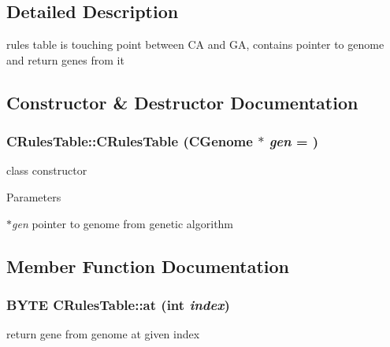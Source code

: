 \subsection{Detailed Description}
rules table is touching point between CA and GA, contains pointer to genome and return genes from it 

\subsection{Constructor \& Destructor Documentation}
\hypertarget{classCRulesTable_a17239390129d5e8f517046633c9f1d87}{
\subsubsection[{CRulesTable}]{\setlength{\rightskip}{0pt plus 5cm}CRulesTable::CRulesTable ({\bf CGenome} $\ast$ {\em gen} = {})}}
\label{classCRulesTable_a17239390129d5e8f517046633c9f1d87}
class constructor


\begin{DoxyParams}{Parameters}
\item[{\em $\ast$gen}]pointer to genome from genetic algorithm \end{DoxyParams}


\subsection{Member Function Documentation}
\hypertarget{classCRulesTable_abe2bf05bb6865422c3ff9fcc24838003}{
\subsubsection[{at}]{\setlength{\rightskip}{0pt plus 5cm}BYTE CRulesTable::at (int {\em index})}}
\label{classCRulesTable_abe2bf05bb6865422c3ff9fcc24838003}
return gene from genome at given index


